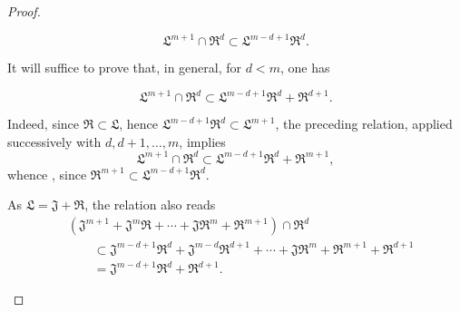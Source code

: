 \begin{proof}
\begin{env}[19.7.1.13]
\label{IV.19.7.1.13}
\[
  \mathfrak{L}^{m+1}\cap\mathfrak{R}^d\subset\mathfrak{L}^{m-d+1}\mathfrak{R}^d.
\]
\end{env}

It will suffice to prove that, in general, for $d<m$, one has

\begin{env}[19.7.1.14]
\label{IV.19.7.1.14}
\[
  \mathfrak{L}^{m+1}\cap\mathfrak{R}^d\subset\mathfrak{L}^{m-d+1}\mathfrak{R}^d+\mathfrak{R}^{d+1}.
\]
\end{env}

Indeed, since $\mathfrak{R}\subset\mathfrak{L}$, hence $\mathfrak{L}^{m-d+1}\mathfrak{R}^d\subset\mathfrak{L}^{m+1}$, the preceding relation, applied successively with $d,d+1,\ldots,m$, implies
\[
  \mathfrak{L}^{m+1}\cap\mathfrak{R}^d
  \subset\mathfrak{L}^{m-d+1}\mathfrak{R}^d+\mathfrak{R}^{m+1},
\]
whence , since $\mathfrak{R}^{m+1}\subset\mathfrak{L}^{m-d+1}\mathfrak{R}^d$.

\begin{env}[19.7.1.15]
\label{IV.19.7.1.15}
As $\mathfrak{L}=\mathfrak{J}+\mathfrak{R}$, the relation  also reads
\[
\begin{aligned}
  &(\mathfrak{J}^{m+1}+\mathfrak{J}^m\mathfrak{R}+\cdots+\mathfrak{J}\mathfrak{R}^m+\mathfrak{R}^{m+1})\cap\mathfrak{R}^d\\
  &\qquad\subset\mathfrak{J}^{m-d+1}\mathfrak{R}^d+\mathfrak{J}^{m-d}\mathfrak{R}^{d+1}+\cdots+\mathfrak{J}\mathfrak{R}^m+\mathfrak{R}^{m+1}+\mathfrak{R}^{d+1}\\
  &\qquad=\mathfrak{J}^{m-d+1}\mathfrak{R}^d+\mathfrak{R}^{d+1}.
\end{aligned}
\]


\end{env}
\end{proof}
